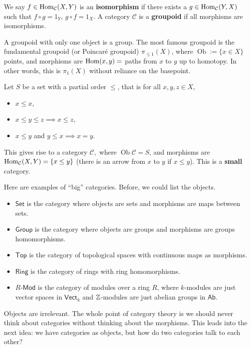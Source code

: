 \begin{definition}[]
    We say $f \in \operatorname{Hom} _{\mathcal{C} }(X,Y)$ is an \textbf{isomorphism} if there exists a  $g \in \operatorname{Hom} _{\mathcal{C} }(Y,X)$ such that $f \circ g=1_Y$, $g \circ f=1_X$. A category $\mathcal{C} $ is a \textbf{groupoid} if all morphisms are isomorphisms.
\end{definition}
\begin{example}
    A groupoid with only one object is a group. The most famous groupoid is the fundamental groupoid (or Poincar\'e groupoid) $\pi_{\leq 1}(X)$, where $\operatorname{Ob}:= \{x \in X\} $ points, and morphisms are $\operatorname{Hom}(x,y)=$ paths from $x$ to $y$ up to homotopy. In other words, this is $\pi_1(X)$ without reliance on the basepoint.
\end{example}
\begin{example}
   Let $S$ be a set with a partial order $\leq$, that is for all $x,y,z \in X$,
   \begin{itemize}
   \setlength\itemsep{-.2em}
       \item $x \leq x$,
       \item $x\leq y \leq z \implies x \leq z$,
        \item $x\leq y$ and $y \leq x \implies x=y$.
   \end{itemize}
   This gives rise to a category $\mathcal{C} , $ where $\operatorname{Ob}\mathcal{C} =S$, and morphisms are $\operatorname{Hom} _{\mathcal{C} }(X,Y)= \{x \leq y\} $ (there is an arrow from $x$ to $y$ if $x\leq y$). This is a \textbf{small} category.
\end{example}
\begin{example}
    Here are examples of ``big'' categories. Before, we could list the objects. 
    \begin{itemize}
    \setlength\itemsep{-.2em}
        \item $\mathsf{Set} $ is the category where objects are sets and morphisms are maps between sets.
        \item $\mathsf{Group} $ is the category where objects are groups and morphisms are groups homomorphisms.
        \item $\mathsf{Top} $ is the category of topological spaces with continuous maps as morphisms.
        \item $\mathsf{Ring} $ is the category of rings with ring homomorphisms. 
        \item $R$-$\mathsf{Mod} $ is the category of modules over a ring $R$, where $k$-modules are just vector spaces in $\mathsf{Vect} _k$ and $\mathbb{Z}$-modules are just abelian groups in $\mathsf{Ab} $.
    \end{itemize}
    Objects are irrelevant. The whole point of category theory is we should never think about categories without thinking about the morphisms. This leads into the next idea: we have categories as objects, but how do two categories talk to each other?
\end{example}

